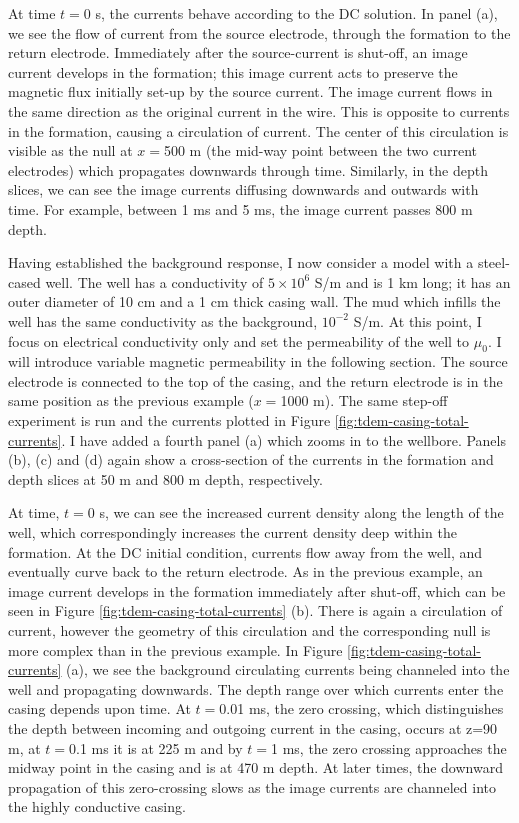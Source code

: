 At time $t=$0 s, the currents behave according to the DC solution. In panel (a), we see the flow of current from the source electrode, through the formation to the return electrode. Immediately after the source-current is shut-off, an image current develops in the formation; this image current acts to preserve the magnetic flux initially set-up by the source current. The image current flows in the same direction as the original current in the wire. This is opposite to currents in the formation, causing a circulation of current. The center of this circulation is visible as the null at $x=$500 m (the mid-way point between the two current electrodes) which propagates downwards through time. Similarly, in the depth slices, we can see the image currents diffusing downwards and outwards with time. For example, between 1 ms and 5 ms, the image current passes 800 m depth.

Having established the background response, I now consider a model with a steel-cased well. The well has a conductivity of $5 \times 10^6$ S/m and is 1 km long; it has an outer diameter of 10 cm and a 1 cm thick casing wall. The mud which infills the well has the same conductivity as the background, $10^{-2}$ S/m. At this point, I focus on electrical conductivity only and set the permeability of the well to $\mu_0$. I will introduce variable magnetic permeability in the following section. The source electrode is connected to the top of the casing, and the return electrode is in the same position as the previous example ($x=$1000 m). The same step-off experiment is run and the currents plotted in Figure \ref{fig:tdem-casing-total-currents}. I have added a fourth panel (a) which zooms in to the wellbore. Panels (b), (c) and (d) again show a cross-section of the currents in the formation and depth slices at 50 m and 800 m depth, respectively.




At time, $t=$0 s, we can see the increased current density along the length of the well, which correspondingly increases the current density deep within the formation. At the DC initial condition, currents flow away from the well, and eventually curve back to the return electrode. As in the previous example, an image current develops in the formation immediately after shut-off, which can be seen in Figure \ref{fig:tdem-casing-total-currents} (b). There is again a circulation of current, however the geometry of this circulation and the corresponding null is more complex than in the previous example. In Figure \ref{fig:tdem-casing-total-currents} (a), we see the background circulating currents being channeled into the well and propagating downwards. The depth range over which currents enter the casing depends upon time. At $t=$0.01 ms, the zero crossing, which distinguishes the depth between incoming and outgoing current in the casing, occurs at z=90 m, at $t=$0.1 ms it is at 225 m and by $t=$1 ms, the zero crossing approaches the midway point in the casing and is at 470 m depth. At later times, the downward propagation of this zero-crossing slows as the image currents are channeled into the highly conductive casing.

